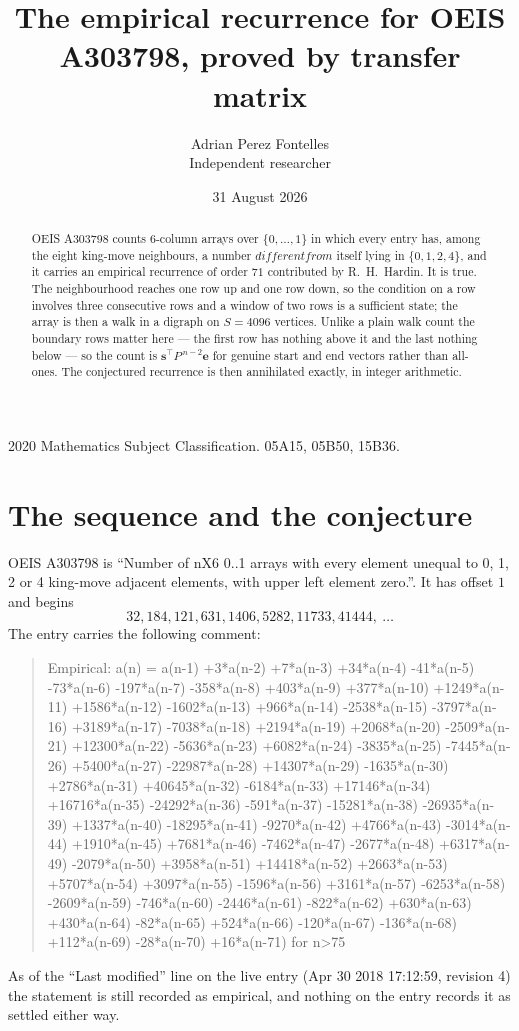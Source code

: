 \documentclass[11pt,a4paper]{article}
\title{The empirical recurrence for OEIS A303798, proved by transfer matrix}
\author{Adrian Perez Fontelles\\ \small Independent researcher}
\date{31 August 2026}
\theoremstyle{plain}
\theoremstyle{definition}
\begin{document}
\maketitle

\begin{abstract}
OEIS A303798 counts $6$-column arrays over $\{0,\dots,1\}$ in which every entry has,
among the eight king-move neighbours, a number $different from$ itself lying in $\{0,1,2,4\}$, and it carries an empirical
recurrence of order $71$ contributed by R.~H.~Hardin. It is true. The neighbourhood
reaches one row up and one row down, so the condition on a row involves three consecutive
rows and a window of two rows is a sufficient state; the array is then a walk in a digraph
on $S=4096$ vertices. Unlike a plain walk count the boundary rows matter here --- the first
row has nothing above it and the last nothing below --- so the count is
$\mathbf{s}^{\!\top}P^{\,n-2}\mathbf{e}$ for genuine start and end vectors rather than
all-ones. The conjectured recurrence is then annihilated exactly, in integer arithmetic.
\end{abstract}

\noindent\small 2020 Mathematics Subject Classification. 05A15, 05B50, 15B36.\normalsize

\section{The sequence and the conjecture}

OEIS A303798 is ``Number of nX6 0..1 arrays with every element unequal to 0, 1, 2 or 4 king-move adjacent elements, with upper left element zero.''. It has offset
$1$ and begins
\[
32, 184, 121, 631, 1406, 5282, 11733, 41444,\ \dots
\]
The entry carries the following comment:
\begin{quote}\small
Empirical: a(n) = a(n-1) +3*a(n-2) +7*a(n-3) +34*a(n-4) -41*a(n-5) -73*a(n-6) -197*a(n-7) -358*a(n-8) +403*a(n-9) +377*a(n-10) +1249*a(n-11) +1586*a(n-12) -1602*a(n-13) +966*a(n-14) -2538*a(n-15) -3797*a(n-16) +3189*a(n-17) -7038*a(n-18) +2194*a(n-19) +2068*a(n-20) -2509*a(n-21) +12300*a(n-22) -5636*a(n-23) +6082*a(n-24) -3835*a(n-25) -7445*a(n-26) +5400*a(n-27) -22987*a(n-28) +14307*a(n-29) -1635*a(n-30) +2786*a(n-31) +40645*a(n-32) -6184*a(n-33) +17146*a(n-34) +16716*a(n-35) -24292*a(n-36) -591*a(n-37) -15281*a(n-38) -26935*a(n-39) +1337*a(n-40) -18295*a(n-41) -9270*a(n-42) +4766*a(n-43) -3014*a(n-44) +1910*a(n-45) +7681*a(n-46) -7462*a(n-47) -2677*a(n-48) +6317*a(n-49) -2079*a(n-50) +3958*a(n-51) +14418*a(n-52) +2663*a(n-53) +5707*a(n-54) +3097*a(n-55) -1596*a(n-56) +3161*a(n-57) -6253*a(n-58) -2609*a(n-59) -746*a(n-60) -2446*a(n-61) -822*a(n-62) +630*a(n-63) +430*a(n-64) -82*a(n-65) +524*a(n-66) -120*a(n-67) -136*a(n-68) +112*a(n-69) -28*a(n-70) +16*a(n-71) for n>75
\end{quote}
As of the ``Last modified'' line on the live entry (Apr 30 2018 17:12:59, revision
4) the statement is still recorded as empirical, and nothing on the entry
records it as settled either way.
\end{document}
